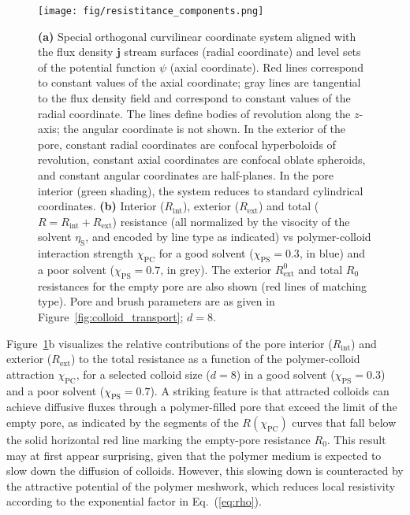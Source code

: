 \documentclass[12pt, a4paper]{article}
\begin{document}
\begin{figure}
    \centering
    \texttt{[image: fig/resistitance\_components.png]}
    \caption{
    \textbf{(a)} Special orthogonal curvilinear coordinate system aligned with the flux density $\bm{j}$ stream surfaces (radial coordinate) and level sets of the potential function $\psi$ (axial coordinate).
    Red lines correspond to constant values of the axial coordinate; gray lines are tangential to the flux density field and correspond to constant values of the radial coordinate.
    The lines define bodies of revolution along the $z$-axis; the angular coordinate is not shown.
    In the exterior of the pore, constant radial coordinates are confocal hyperboloids of revolution, constant axial coordinates are confocal oblate spheroids, and constant angular coordinates are half-planes.
    In the pore interior (green shading), the system reduces to standard cylindrical coordinates. 
    \textbf{(b)} Interior ($R_{\text{int}}$), exterior ($R_{\text{ext}}$) and total ($R = R_{\text{int}} + R_{\text{ext}}$) resistance (all normalized by the visocity of the solvent $\eta_\text{S}$, and encoded by line type as indicated) vs polymer-colloid interaction strength $\chi_{\text{PC}}$ for a good solvent ($\chi_{\text{PS}} = 0.3$, in blue) and a poor solvent ($\chi_{\text{PS}} = 0.7$, in grey).
    The exterior $R_{\text{ext}}^{0}$ and total $R_0$ resistances for the empty pore are also shown (red lines of matching type).  
    Pore and brush parameters are as given in Figure~\ref{fig:colloid_transport}; $d = 8$.
    }
    \label{fig:resistivity_profile}
\end{figure}

Figure~\ref{fig:resistivity_profile}b visualizes the relative contributions of the pore interior ($R_{\text{int}}$) and exterior ($R_{\text{ext}}$) to the total resistance as a function of the polymer-colloid attraction $\chi_\text{PC}$,
for a selected colloid size ($d = 8$) in a good solvent ($\chi_\text{PS} = 0.3$) and a poor solvent ($\chi_\text{PS} = 0.7$).
A striking feature is that attracted colloids can achieve diffusive fluxes through a polymer-filled pore that exceed the limit of the empty pore, as indicated by the segments of the $R(\chi_{\text{PC}})$ curves that fall below the solid horizontal red line marking the empty-pore resistance $R_{0}$.
This result may at first appear surprising, given that the polymer medium is expected to slow down the diffusion of colloids.
However, this slowing down is counteracted by the attractive potential of the polymer meshwork, which reduces local resistivity according to the exponential factor in Eq.~(\ref{eq:rho}).
\end{document}
